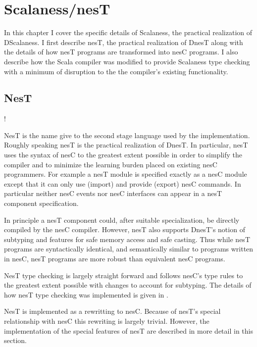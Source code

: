 \chapter{Scalaness/nesT}
\label{chapter-scalaness-nest}

In this chapter I cover the specific details of Scalaness, the practical realization of
DScalaness. I first describe nesT, the practical realization of DnesT along with the details of
how nesT programs are transformed into nesC programs. I also describe how the Scala compiler was
modified to provide Scalaness type checking with a minimum of disruption to the the compiler's
existing functionality.

\section{NesT}
\label{section-nest-implementation}

\lstset{language=nesC}
\lstMakeShortInline!


NesT is the name give to the second stage language used by the implementation. Roughly speaking
nesT is the practical realization of DnesT. In particular, nesT uses the syntax of nesC to the
greatest extent possible in order to simplify the compiler and to minimize the learning burden
placed on existing nesC programmers. For example a nesT module is specified exactly as a nesC
module except that it can only use (import) and provide (export) nesC commands. In particular
neither nesC events nor nesC interfaces can appear in a nesT component specification.

In principle a nesT component could, after suitable specialization, be directly compiled by the
nesC compiler. However, nesT also supports DnesT's notion of subtyping and features for safe
memory access and safe casting. Thus while nesT programs are syntactically identical, and
semantically similar to programs written in nesC, nesT programs are more robust than equivalent
nesC programs.

NesT type checking is largely straight forward and follows nesC's type rules to the greatest
extent possible with changes to account for subtyping. The details of how nesT type checking was
implemented is given in \cite{watson-masters-2013}.

NesT is implemented as a rewritting to nesC. Because of nesT's special relationship with nesC
this rewriting is largely trivial. However, the implementation of the special features of nesT
are described in more detail in this section.

